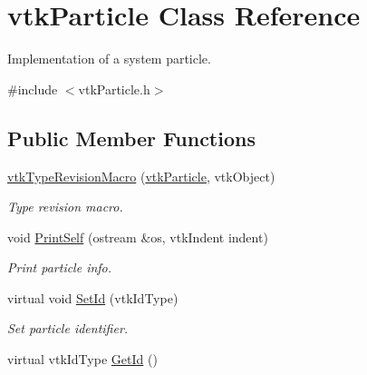 \hypertarget{classvtkParticle}{
\section{vtkParticle Class Reference}
\label{classvtkParticle}
}


Implementation of a system particle.  




{\ttfamily \#include $<$vtkParticle.h$>$}

\subsection*{Public Member Functions}
\begin{DoxyCompactItemize}
\item 
\hypertarget{classvtkParticle_aea4bd59c524e54b6c0c6a9bd14287259}{
\hyperlink{classvtkParticle_aea4bd59c524e54b6c0c6a9bd14287259}{vtkTypeRevisionMacro} (\hyperlink{classvtkParticle}{vtkParticle}, vtkObject)}
\label{classvtkParticle_aea4bd59c524e54b6c0c6a9bd14287259}

\begin{DoxyCompactList}\small\item\em Type revision macro. \item\end{DoxyCompactList}\item 
\hypertarget{classvtkParticle_a745d711722de78a74bdc4c31727328a9}{
void \hyperlink{classvtkParticle_a745d711722de78a74bdc4c31727328a9}{PrintSelf} (ostream \&os, vtkIndent indent)}
\label{classvtkParticle_a745d711722de78a74bdc4c31727328a9}

\begin{DoxyCompactList}\small\item\em Print particle info. \item\end{DoxyCompactList}\item 
\hypertarget{classvtkParticle_ac856f1c127b7b5b594bc64625ca440ac}{
virtual void \hyperlink{classvtkParticle_ac856f1c127b7b5b594bc64625ca440ac}{SetId} (vtkIdType)}
\label{classvtkParticle_ac856f1c127b7b5b594bc64625ca440ac}

\begin{DoxyCompactList}\small\item\em Set particle identifier. \item\end{DoxyCompactList}\item 
\hypertarget{classvtkParticle_a39a52bcc50831681115cd35c0398a9fd}{
virtual vtkIdType \hyperlink{classvtkParticle_a39a52bcc50831681115cd35c0398a9fd}{GetId} ()}
\label{classvtkParticle_a39a52bcc50831681115cd35c0398a9fd}


\end{DoxyCompactItemize}
